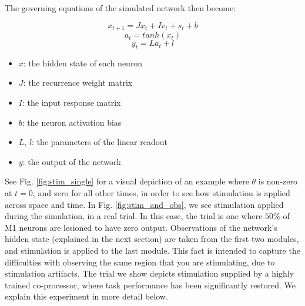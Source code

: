\documentclass[12pt]{iopart}
\begin{document}
The governing equations of the simulated network then become:

\begin{equation}
x_{t+1} = Jx_{t} + Iv_{t} + s_{t} + b
\end{equation}
\begin{equation}
a_{t} = tanh(x_{t})
\end{equation}
\begin{equation}
y_{t} = La_{t} + l
\end{equation}

\begin{itemize}
	\item $x$: the hidden state of each neuron
	\item $J$: the recurrence weight matrix
	\item $I$: the input response matrix
	\item $b$: the neuron activation bias
	\item $L$, $l$: the parameters of the linear readout
	\item $y$: the output of the network
\end{itemize}

See Fig. \ref{fig:stim_single} for a visual depiction of an example where
$\theta$ is non-zero at $t=0$, and zero for all other times, in order to see how
stimulation is applied across space and time. In Fig. \ref{fig:stim_and_obs},
we see stimulation applied during the simulation, in a real trial. In this case,
the trial is one where $50\%$ of M1 neurons are lesioned to have zero output.
Observations of the network's hidden state (explained in the next section) are taken
from the first two modules, and stimulation is applied to the last module. This fact
is intended to capture the difficulties with observing the same region that you are
stimulating, due to stimulation artifacts. The trial we show depicts stimulation
supplied by a highly trained co-processor, where task performance has been
significantly restored. We explain this experiment in more detail below.
\end{document}
